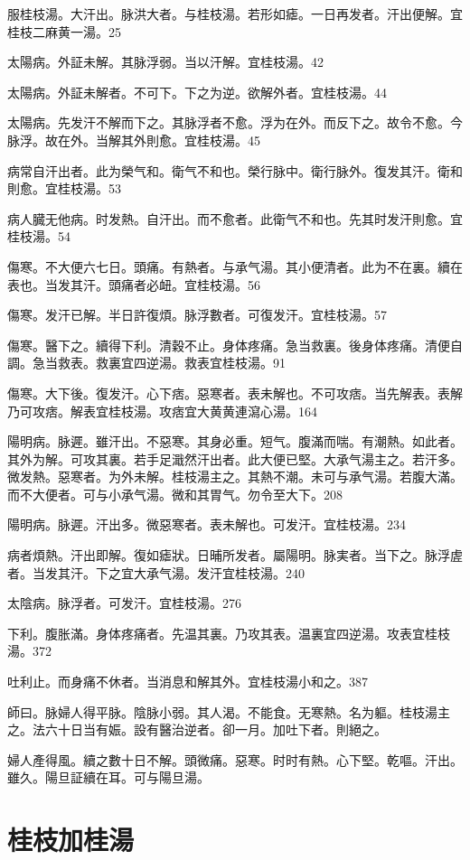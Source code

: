 服桂枝湯。大汗出。脉洪大者。与桂枝湯。若形如瘧。一日再发者。汗出便解。宜桂枝二麻黄一湯。25

太陽病。外証未解。其脉浮弱。当以汗解。宜桂枝湯。42

太陽病。外証未解者。不可下。下之为逆。欲解外者。宜桂枝湯。44

太陽病。先发汗不解而下之。其脉浮者不愈。浮为在外。而反下之。故令不愈。今脉浮。故在外。当解其外則愈。宜桂枝湯。45

病常自汗出者。此为榮气和。衛气不和也。榮行脉中。衛行脉外。復发其汗。衛和則愈。宜桂枝湯。53

病人臓无他病。时发熱。自汗出。而不愈者。此衛气不和也。先其时发汗則愈。宜桂枝湯。54

傷寒。不大便六七日。頭痛。有熱者。与承气湯。其小便清者。此为不在裏。續在表也。当发其汗。頭痛者必衄。宜桂枝湯。56

傷寒。发汗已解。半日許復煩。脉浮數者。可復发汗。宜桂枝湯。57

傷寒。醫下之。續得下利。清穀不止。身体疼痛。急当救裏。後身体疼痛。清便自調。急当救表。救裏宜四逆湯。救表宜桂枝湯。91

傷寒。大下後。復发汗。心下痞。惡寒者。表未解也。不可攻痞。当先解表。表解乃可攻痞。解表宜桂枝湯。攻痞宜大黄黄連瀉心湯。164

陽明病。脉遲。雖汗出。不惡寒。其身必重。短气。腹滿而喘。有潮熱。如此者。其外为解。可攻其裏。若手足濈然汗出者。此大便已堅。{\khaai 大}承气湯主之。若汗多。微发熱。惡寒者。为外未解。{\khaai 桂枝湯主之。}其熱不潮。未可与承气湯。若腹大滿。而不大便者。可与小承气湯。微和其胃气。勿令至大下。208

陽明病。脉遲。汗出多。微惡寒者。表未解也。可发汗。宜桂枝湯。234

病者煩熱。汗出即解。復如瘧狀。日晡所发者。屬陽明。脉実者。当下之。脉浮虗者。当发其汗。下之宜{\khaai 大}承气湯。发汗宜桂枝湯。240

太陰病。脉浮者。可发汗。宜桂枝湯。276

下利。腹{\khaai 胀}滿。身体疼痛者。先温其裏。乃攻其表。温裏宜四逆湯。攻表宜桂枝湯。372

吐利止。而身痛不休者。当消息和解其外。宜桂枝湯小和之。387

師曰。脉婦人得平脉。陰脉小弱。其人渴。不能食。无寒熱。名为軀。桂枝湯主之。法六十日当有娠。設有醫治逆者。卻一月。加吐下者。則絕之。

婦人產得風。續之數十日不解。頭微痛。惡寒。时时有熱。心下堅。乾嘔。汗出。雖久。陽旦証續在耳。可与陽旦湯。

\section{桂枝加桂湯}


